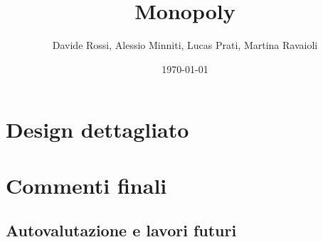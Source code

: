 \documentclass[a4paper,12pt]{report}
\title{Monopoly}
\author{Davide Rossi, Alessio Minniti, Lucas Prati, Martina Ravaioli}
\date{\today}
\begin{document}
\maketitle

\tableofcontents



\section{Design dettagliato}

\section{Commenti finali}
\subsection{Autovalutazione e lavori futuri}


\end{document}
